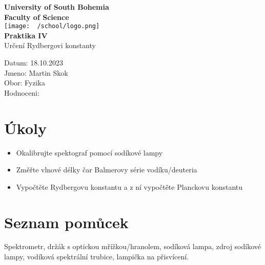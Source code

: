 \documentclass{article}
\begin{document}
\begin{center}
\textbf{\Huge{University of South Bohemia}}\\
\vspace{50px}
\textbf{\Large{Faculty of Science}} \\
\vspace{30px}
\texttt{[image: ~/school/logo.png]} \\
\vspace{30px}
\textbf{\large{Praktika IV}}
\vspace{20px}
\\
\vspace{20px}
\large{Určení Rydbergovi konstanty} \\
\vspace{60px}
\end{center}
\begin{flushleft}
Datum: 18.10.2023 \\
Jmeno: Martin Skok \\
Obor: Fyzika \\
Hodnoceni:
\end{flushleft}
\newpage
\section{Úkoly}
\begin{itemize}
        \item Okalibrujte spektograf pomocí sodíkové lampy
        \item Změřte vlnové délky čar Balmerovy série vodíku/deuteria
        \item Vypočtěte Rydbergovu konstantu a z ní vypočtěte Planckovu konstantu
\end{itemize}

\section{Seznam pomůcek}
Spektrometr, držák s optickou mřížkou/hranolem, sodíková lampa, zdroj sodíkové lampy,
vodíková spektrální trubice, lampička na přisvícení.
\end{document}

